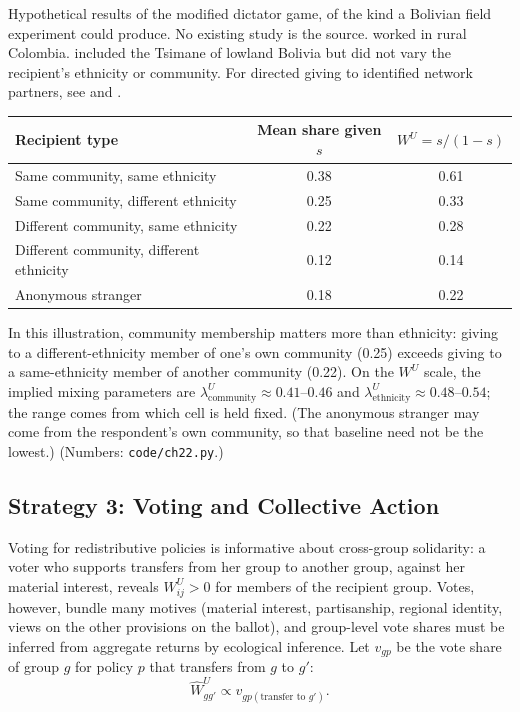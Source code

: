 \documentclass[../structural_economics_book.tex]{subfiles}
\begin{document}
\begin{example}\label{ch22:ex:experimental}
Hypothetical results of the modified dictator game, of the kind a Bolivian field experiment could produce. No existing study is the source. \citet{cardenas2003real} worked in rural Colombia. \citet{henrich2010markets} included the Tsimane of lowland Bolivia but did not vary the recipient's ethnicity or community. For directed giving to identified network partners, see \citet{leider2009directed} and \citet{ligon2012motives}.
\begin{center}
\begin{tabular}{lcc}
\toprule
Recipient type & Mean share given $s$ & $W^U = s/(1-s)$ \\
\midrule
Same community, same ethnicity & 0.38 & 0.61 \\
Same community, different ethnicity & 0.25 & 0.33 \\
Different community, same ethnicity & 0.22 & 0.28 \\
Different community, different ethnicity & 0.12 & 0.14 \\
Anonymous stranger & 0.18 & 0.22 \\
\bottomrule
\end{tabular}
\end{center}

In this illustration, community membership matters more than ethnicity: giving to a different-ethnicity member of one's own community (0.25) exceeds giving to a same-ethnicity member of another community (0.22). On the $W^U$ scale, the implied mixing parameters are $\lambda^U_{\text{community}} \approx 0.41$--$0.46$ and $\lambda^U_{\text{ethnicity}} \approx 0.48$--$0.54$; the range comes from which cell is held fixed. (The anonymous stranger may come from the respondent's own community, so that baseline need not be the lowest.) (Numbers: \texttt{code/ch22.py}.)
\end{example}


\subsection{Strategy 3: Voting and Collective Action}

\begin{definition}\label{ch22:def:collective}
Voting for redistributive policies is informative about cross-group solidarity: a voter who supports transfers from her group to another group, against her material interest, reveals $W^U_{ij} > 0$ for members of the recipient group. Votes, however, bundle many motives (material interest, partisanship, regional identity, views on the other provisions on the ballot), and group-level vote shares must be inferred from aggregate returns by ecological inference. Let $v_{gp}$ be the vote share of group $g$ for policy $p$ that transfers from $g$ to $g'$:
\begin{equation}\label{ch22:eq:voting_WU}
\hat{W}^U_{gg'} \propto v_{gp(\text{transfer to } g')}.
\end{equation}
\end{definition}
\end{document}
